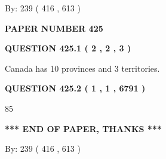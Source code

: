 \documentclass[12pt]{article}
\begin{document}
   
\hspace{1.0in} By: 
 239 ( 416 ,  613 )
   
   
   
   
\newpage 
\setcounter{page}{ 
   425001 } 
   
   
   
   
 {\textbf{ \Large{ PAPER NUMBER  425  }}}
   
   
\vspace{0.2in}
   
   
   
   
   
   
 \vspace{0.2in}
 
 
 
 
   
   
  
\vspace{0.2in}
  
{\textbf{\Large{QUESTION
425.1 
 ( 2 , 2 , 3 )
}}}
  
  
 
 
\noindent{}
 
 
Canada has 10  provinces and 3 territories.
 
 
 
 
  
\vspace{0.2in}
  
{\textbf{\Large{QUESTION
425.2 
 ( 1 , 1 , 6791 )
}}}
  
  
 
 
\noindent{}

85
 
 
   
   
 \vspace{0.2in}
 
   
   
   
   
\vspace{1.0in} 
{\textbf{\large{ *** END OF PAPER, THANKS *** }}} 
   
   
\hspace{1.0in} By: 
 239 ( 416 ,  613 )
   
   
   
   
\newpage 
\setcounter{page}{ 
   426001 } 
   
\end{document}

